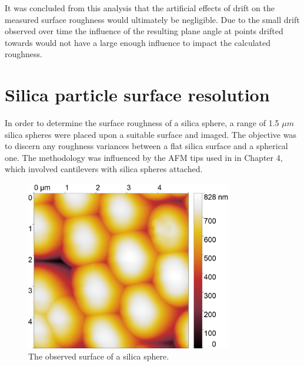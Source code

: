 It was concluded from this analysis that the artificial effects of drift on the measured surface roughness would ultimately be negligible. Due to the small drift observed over time the influence of the resulting plane angle at points drifted towards would not have a large enough influence to impact the calculated roughness.









\section{Silica particle surface resolution} %

In order to determine the surface roughness of a silica sphere, a range of 1.5 $\mu m$ silica spheres were placed upon a suitable surface and imaged. The objective was to discern any roughness variances between a flat silica surface and a spherical one. The methodology was influenced by the AFM tips used in in Chapter 4, which involved cantilevers with silica spheres attached.



\begin{figure}[h]     %
        \begin{center}
          \includegraphics[width=90mm]{chapter3/5umareat2.jpg}
\end{center}
\caption{The observed surface of a silica sphere.}
\label{fig:SiliSph1}                 %
\end{figure}

